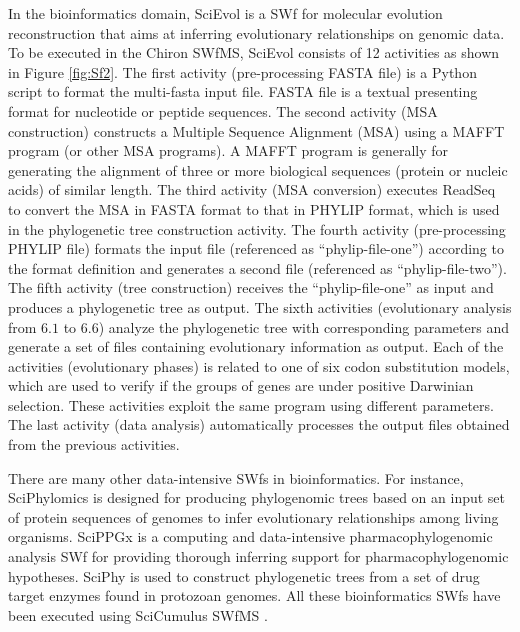 In the bioinformatics domain, SciEvol \cite{Ocana2012} is a SWf
for molecular evolution reconstruction that aims at inferring evolutionary
relationships on genomic data. To be executed in the Chiron SWfMS, SciEvol consists of 12 activities as shown in Figure \ref{fig:Sf2}. The first activity (pre-processing FASTA file) is a Python script to format
the multi-fasta input file.
FASTA file is a textual presenting format for nucleotide
or peptide sequences. 
The second activity (MSA construction) constructs
a Multiple Sequence Alignment (MSA) using a MAFFT program (or other
MSA programs). A MAFFT program is generally for generating the alignment of three or more biological sequences (protein or nucleic acids) of similar length. 
The third activity (MSA conversion) executes ReadSeq to convert the MSA
in FASTA format to that in PHYLIP format, which is used in the phylogenetic tree construction activity. 
The fourth activity (pre-processing PHYLIP file) formats the input file (referenced as \textquotedblleft{}phylip-file-one\textquotedblright{}) according to the format definition and generates a second file (referenced as \textquotedblleft{}phylip-file-two\textquotedblright{}).
The fifth activity (tree construction) receives the \textquotedblleft{}phylip-file-one\textquotedblright{}
as input and produces a phylogenetic tree \cite{Felsenstein1989} as output. 
The sixth activities (evolutionary analysis from $6.1$ to
$6.6$) analyze the phylogenetic tree with corresponding parameters and
generate a set of files containing evolutionary information as
output. 
Each of the activities (evolutionary phases) is related to one of
six codon substitution models, which are used to verify if the
groups of genes are under positive Darwinian selection.
These activities exploit the same program using different parameters.
The last activity (data analysis) automatically processes
the output files obtained from the previous activities. 

There are many other data-intensive SWfs in bioinformatics. For
instance, SciPhylomics \cite{Oliveira2013} is designed for producing
phylogenomic trees based on an input set of protein sequences of genomes
to infer evolutionary relationships among living organisms. SciPPGx
\cite{Dias2012} is a computing and data-intensive pharmacophylogenomic
analysis SWf for providing thorough inferring support for pharmacophylogenomic
hypotheses. SciPhy \cite{Ocana2011} is used to construct phylogenetic
trees from a set of drug target enzymes found in protozoan
genomes. All these bioinformatics SWfs have been executed using
SciCumulus SWfMS \cite{Oliveira2010}.

